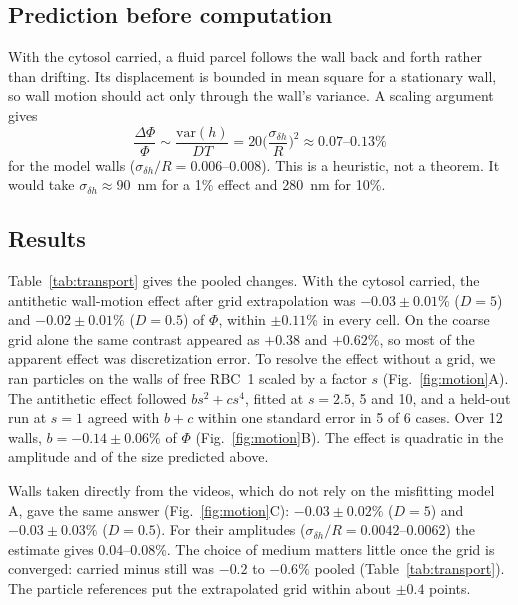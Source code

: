 \documentclass[conference]{IEEEtran}
\begin{document}
\subsection{Prediction before computation}
With the cytosol carried, a fluid parcel follows the wall back and forth rather than drifting. Its
displacement is bounded in mean square for a stationary wall, so wall motion should act only through
the wall's variance. A scaling argument gives
\[
\frac{\Delta\Phi}{\Phi} \sim \frac{\mathrm{var}(h)}{DT} = 20\Big(\frac{\sigma_{\delta h}}{R}\Big)^2
\approx 0.07\text{--}0.13\%
\]
for the model walls ($\sigma_{\delta h}/R = 0.006$--0.008). This is a heuristic, not a theorem. It
would take $\sigma_{\delta h} \approx 90$~nm for a 1\% effect and 280~nm for 10\%.

\subsection{Results}
Table~\ref{tab:transport} gives the pooled changes. With the cytosol carried, the antithetic
wall-motion effect after grid extrapolation was $-0.03 \pm 0.01\%$ ($D = 5$) and $-0.02 \pm 0.01\%$
($D = 0.5$) of $\Phi$, within $\pm0.11\%$ in every cell. On the coarse grid alone the same contrast appeared
as $+0.38$ and $+0.62\%$, so most of the apparent effect was discretization error. To resolve the
effect without a grid, we ran particles on the walls of free RBC~1 scaled by a factor $s$
(Fig.~\ref{fig:motion}A). The antithetic effect followed $bs^2 + cs^4$, fitted at $s = 2.5$, 5 and
10, and a held-out run at $s = 1$ agreed with $b + c$ within one standard error in 5 of 6 cases.
Over 12 walls, $b = -0.14 \pm 0.06\%$ of $\Phi$ (Fig.~\ref{fig:motion}B). The effect is quadratic in the amplitude and of the
size predicted above.

Walls taken directly from the videos, which do not rely on the misfitting model A, gave the same
answer (Fig.~\ref{fig:motion}C): $-0.03\pm0.02\%$ ($D = 5$) and $-0.03\pm0.03\%$ ($D = 0.5$). For
their amplitudes ($\sigma_{\delta h}/R = 0.0042$--0.0062) the estimate gives 0.04--0.08\%. The choice
of medium matters little once the grid is converged: carried minus still was $-0.2$ to $-0.6\%$
pooled (Table~\ref{tab:transport}). The particle references put the extrapolated grid within about
$\pm0.4$ points.
\end{document}

